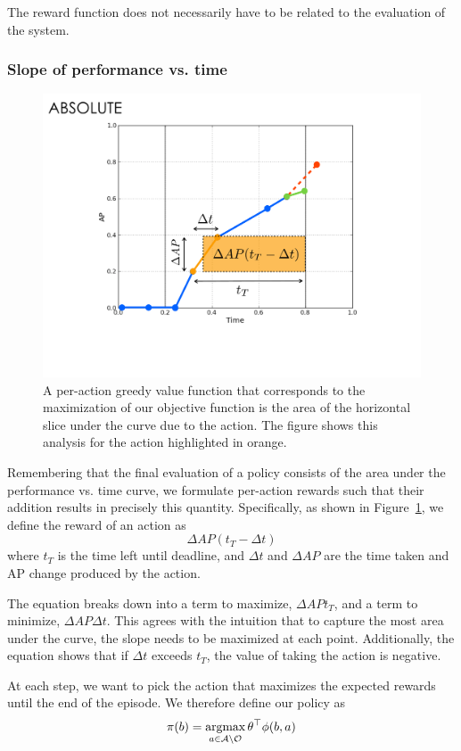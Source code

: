 The reward function does not necessarily have to be related to the evaluation of the system.

\subsubsection{Slope of performance vs. time}
\begin{figure}[htb]
  \centering
  \includegraphics[width=0.56\linewidth]{figures/apvst_expl.pdf}
  \caption{A per-action greedy value function that corresponds to the maximization of our objective function is the area of the horizontal slice under the curve due to the action. The figure shows this analysis for the action highlighted in orange.}
  \label{fig:rewards}
\end{figure}

Remembering that the final evaluation of a policy consists of the area under the performance vs. time curve, we formulate per-action rewards such that their addition results in precisely this quantity.
Specifically, as shown in Figure~\ref{fig:rewards}, we define the reward of an action as
\begin{equation}\label{eq:advanced}
\Delta AP (t_T-\Delta t)
\end{equation}
where $t_T$ is the time left until deadline, and $\Delta t$ and $\Delta AP$ are the time taken and AP change produced by the action.

The equation breaks down into a term to maximize, $\Delta AP t_T$, and a term to minimize, $\Delta AP \Delta t$.
This agrees with the intuition that to capture the most area under the curve, the slope needs to be maximized at each point.
Additionally, the equation shows that if $\Delta t$ exceeds $t_T$, the value of taking the action is negative.

At each step, we want to pick the action that maximizes the expected rewards until the end of the episode.
We therefore define our policy as
\begin{equation}
\pi(b) = \argmax_{a \in \mathcal{A} \setminus \mathcal{O}} \theta^\top \phi(b,a)
\end{equation}

